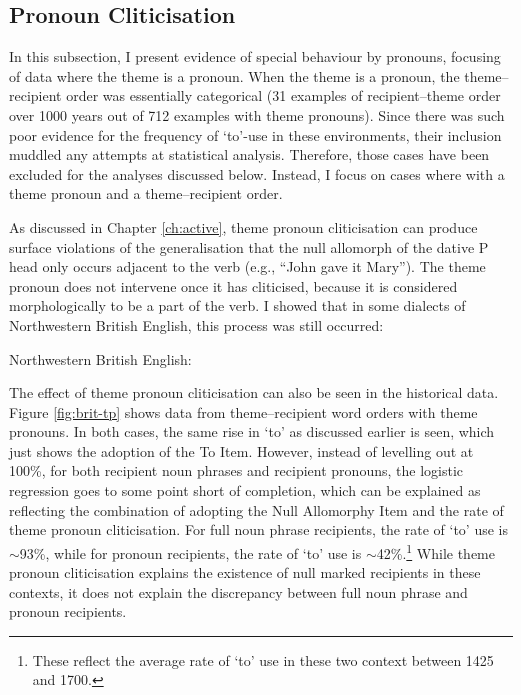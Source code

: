	\subsection{Pronoun Cliticisation}\label{sec:act-tp}
	In this subsection, I present evidence of special behaviour by pronouns, focusing of data where the theme is a pronoun. When the theme is a pronoun, the theme--recipient order was essentially categorical (31 examples of recipient--theme order over 1000 years out of 712 examples with theme pronouns). Since there was such poor evidence for the frequency of `to'-use in these environments, their inclusion muddled any attempts at statistical analysis. Therefore, those cases have been excluded for the analyses discussed below. Instead, I focus on cases where with a theme pronoun and a theme--recipient order.

	As discussed in Chapter \ref{ch:active}, theme pronoun cliticisation can produce surface violations of the generalisation that the null allomorph of the dative P head only occurs adjacent to the verb (e.g., ``John gave it Mary''). The theme pronoun does not intervene once it has cliticised, because it is considered morphologically to be a part of the verb. I showed that in some dialects of Northwestern British English, this process was still occurred:

	\begin{exe}
		 Northwestern British English:
		\begin{xlist}
	\end{xlist}
	\end{exe}

	The effect of theme pronoun cliticisation can also be seen in the historical data. Figure \ref{fig:brit-tp} shows data from theme--recipient word orders with theme pronouns. In both cases, the same rise in `to' as discussed earlier is seen, which just shows the adoption of the To Item. However, instead of levelling out at 100\%, for both recipient noun phrases and recipient pronouns, the logistic regression goes to some point short of completion, which can be explained as reflecting the combination of adopting the Null Allomorphy Item and the rate of theme pronoun cliticisation. For full noun phrase recipients, the rate of `to' use is $\sim$93\%, while for pronoun recipients, the rate of `to' use is $\sim$42\%.\footnote{These reflect the average rate of `to' use in these two context between 1425 and 1700.} While theme pronoun cliticisation explains the existence of null marked recipients in these contexts, it does not explain the discrepancy between full noun phrase and pronoun recipients.


